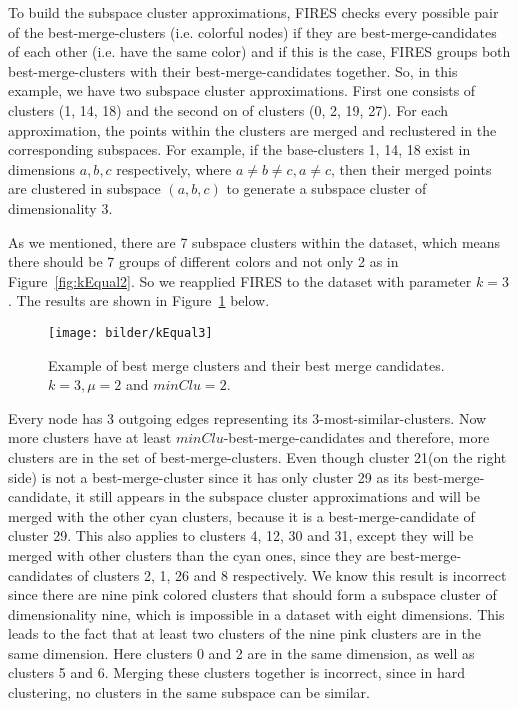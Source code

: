 To build the subspace cluster approximations, FIRES checks every possible pair of the best-merge-clusters (i.e. colorful nodes) if they are best-merge-candidates of each other (i.e. have the same color) and if this is the case, FIRES groups both best-merge-clusters with their best-merge-candidates together. So, in this example, we have two subspace cluster approximations. First one consists of clusters (1, 14, 18) and the second on of clusters (0, 2, 19, 27). For each approximation, the points within the clusters are merged and reclustered in the corresponding subspaces. For example, if the base-clusters 1, 14, 18 exist in dimensions $a, b ,c$ respectively, where $a\neq b\neq c, a\neq c$, then their merged points are clustered in subspace $(a,b,c)$ to generate a subspace cluster of dimensionality 3.

As we mentioned, there are 7 subspace clusters within the dataset, which means there should be 7 groups of different colors and not only 2 as in Figure~\ref{fig:kEqual2}. So we reapplied FIRES to the dataset with parameter $k = 3$. The results are shown in Figure~\ref{fig:kEqual3} below.
\begin{figure}[h]
	\centering
	\texttt{[image: bilder/kEqual3]}
	\caption{Example of best merge clusters and their best merge candidates. $k = 3, \mu = 2$ and $minClu = 2.$}
	\label{fig:kEqual3}
\end{figure}

Every node has 3 outgoing edges representing its 3-most-similar-clusters. Now more clusters have at least $minClu$-best-merge-candidates and therefore, more clusters are in the set of best-merge-clusters. Even though cluster 21(on the right side) is not a best-merge-cluster since it has only cluster 29 as its best-merge-candidate, it still appears in the subspace cluster approximations and will be merged with the other cyan clusters, because it is a best-merge-candidate of cluster 29. This also applies to clusters 4, 12, 30 and 31, except they will be merged with other clusters than the cyan ones, since they are best-merge-candidates of clusters 2, 1, 26 and 8 respectively. We know this result is incorrect since there are nine pink colored clusters that should form a subspace cluster of dimensionality nine, which is impossible in a dataset with eight dimensions. This leads to the fact that at least two clusters of the nine pink clusters are in the same dimension. Here clusters 0 and 2 are in the same dimension, as well as clusters 5 and 6. Merging these clusters together is incorrect, since in hard clustering, no clusters in the same subspace can be similar.

